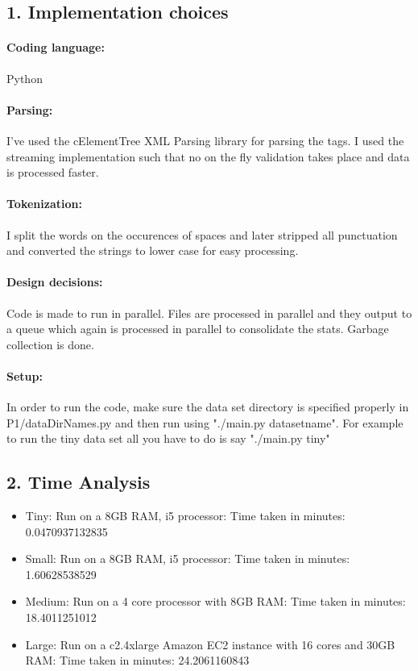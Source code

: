 \documentclass[12pt,letterpaper]{article}
\begin{document}
\subsection*{1. Implementation choices}

\paragraph{Coding language:} Python 
\paragraph{Parsing:} I've used the cElementTree XML Parsing library for parsing the tags. I used the streaming implementation such that no on the fly validation takes place and data is processed faster. \\
\paragraph{Tokenization:} I split the words on the occurences of spaces and later stripped all punctuation and converted the strings to lower case for easy processing. \\
\paragraph{Design decisions:} Code is made to run in parallel. Files are processed in parallel and they output to a queue which again is processed in parallel to consolidate the stats. Garbage collection is done.\\
\paragraph{Setup: }In order to run the code, make sure the data set directory is specified properly in P1/dataDirNames.py and then run using "./main.py datasetname". For example to run the tiny data set all you have to do is say "./main.py tiny"

\subsection*{2. Time Analysis}
\begin{itemize}
\item Tiny: Run on a 8GB RAM, i5 processor: Time taken in minutes: 0.0470937132835
\item Small: Run on a 8GB RAM, i5 processor: Time taken in minutes: 1.60628538529
\item Medium: Run on a 4 core processor with 8GB RAM: Time taken in minutes: 18.4011251012
\item Large: Run on a c2.4xlarge Amazon EC2 instance with 16 cores and 30GB RAM: Time taken in minutes: 24.2061160843 
\end{itemize}
\end{document}
